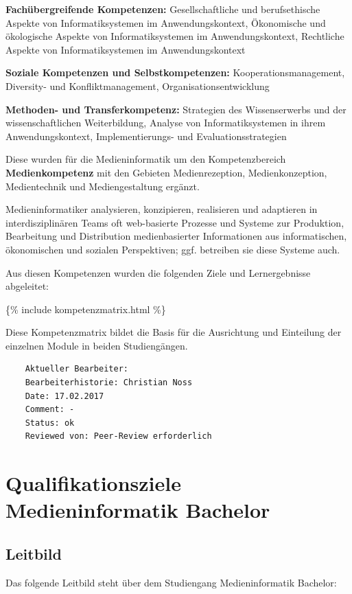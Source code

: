 \textbf{Fachübergreifende Kompetenzen:} Gesellschaftliche und
berufsethische Aspekte von Informatiksystemen im Anwendungskontext,
Ökonomische und ökologische Aspekte von Informatiksystemen im
Anwendungskontext, Rechtliche Aspekte von Informatiksystemen im
Anwendungskontext

\textbf{Soziale Kompetenzen und Selbstkompetenzen:}
Kooperationsmanagement, Diversity- und Konfliktmanagement,
Organisationsentwicklung

\textbf{Methoden- und Transferkompetenz:} Strategien des Wissenserwerbs
und der wissenschaftlichen Weiterbildung, Analyse von Informatiksystemen
in ihrem Anwendungskontext, Implementierungs- und Evaluationsstrategien

Diese wurden für die Medieninformatik um den Kompetenzbereich
\textbf{Medienkompetenz} mit den Gebieten Medienrezeption,
Medienkonzeption, Medientechnik und Mediengestaltung ergänzt.

Medieninformatiker analysieren, konzipieren, realisieren und adaptieren
in interdisziplinären Teams oft web-basierte Prozesse und Systeme zur
Produktion, Bearbeitung und Distribution medienbasierter Informationen
aus informatischen, ökonomischen und sozialen Perspektiven; ggf.
betreiben sie diese Systeme auch.

Aus diesen Kompetenzen wurden die folgenden Ziele und Lernergebnisse
abgeleitet:

\{\% include kompetenzmatrix.html \%\}

Diese Kompetenzmatrix bildet die Basis für die Ausrichtung und
Einteilung der einzelnen Module in beiden Studiengängen.

\begin{verbatim}
    Aktueller Bearbeiter:
    Bearbeiterhistorie: Christian Noss
    Date: 17.02.2017
    Comment: -
    Status: ok
    Reviewed von: Peer-Review erforderlich
\end{verbatim}

\chapter{Qualifikationsziele Medieninformatik
Bachelor}\label{qualifikationsziele-medieninformatik-bachelor}

\section{Leitbild}\label{leitbild}

Das folgende Leitbild steht über dem Studiengang Medieninformatik
Bachelor:

